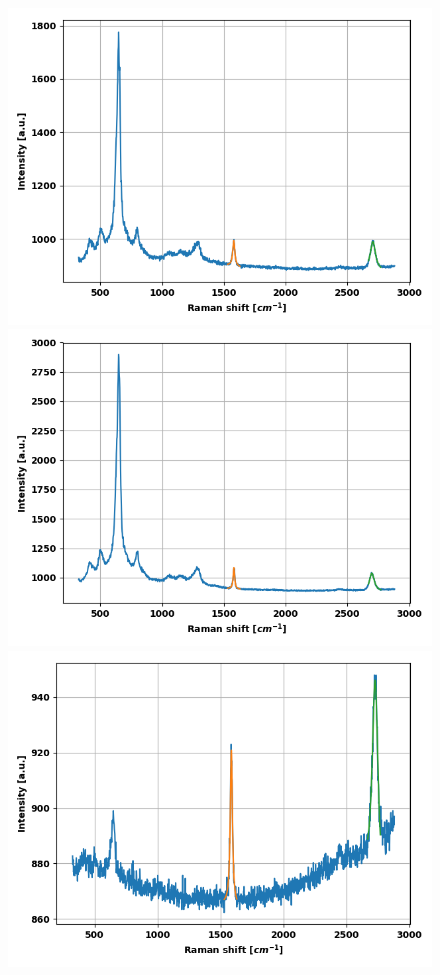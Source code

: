 \documentclass[12pt,a4paper]{article}
\begin{document}
\begin{figure}
\includegraphics[scale=0.5]{Bilder/part6/4.png}
\includegraphics[scale=0.5]{Bilder/part6/5.png}
\includegraphics[scale=0.5]{Bilder/part6/6.png}

\end{figure}
\end{document}

